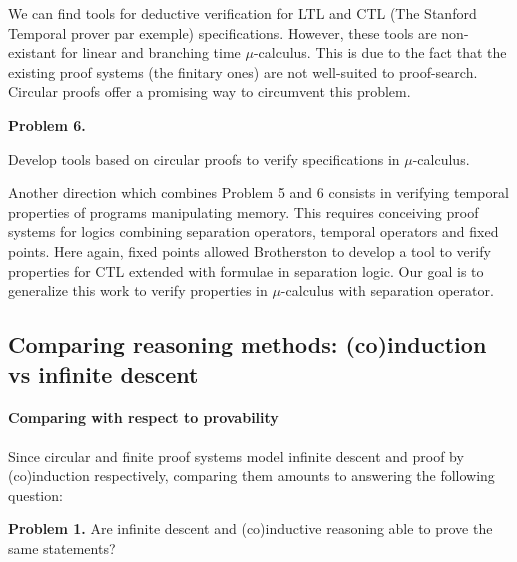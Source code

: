 \documentclass[11pt,twocolumn]{article}
\begin{document}
We can find tools for deductive verification for LTL and CTL (The Stanford Temporal prover par exemple) specifications. However, these tools are non-existant for linear and branching time $\mu$-calculus. This is due to the fact that the existing proof systems (the finitary ones) are not well-suited to proof-search. Circular proofs offer a promising way to circumvent this problem. 


\begin{center}
\begin{bclogo}[logo= ,arrondi = 0.1, couleur = green!10,  epBarre = 0]{}
  \vspace{-10pt}
  \textbf{Problem 6.}
  
  Develop tools based on circular proofs to verify specifications in $\mu$-calculus.
\end{bclogo}
\end{center}

Another direction which combines Problem 5 and 6 consists in verifying temporal properties of programs manipulating memory. This requires conceiving proof systems for logics combining separation operators, temporal operators and fixed points. Here again, fixed points allowed Brotherston to develop a tool  \cite{TellezB17} to verify properties for CTL extended with formulae in separation logic. Our goal is to generalize this work to verify properties in $\mu$-calculus with separation operator.

\subsection{Comparing reasoning methods: (co)induction vs infinite descent}

\label{ComparaisonParkCirc}

\paragraph{Comparing with respect to provability}

Since circular and finite proof systems model infinite descent and proof by (co)induction respectively, comparing them amounts to answering the following question:
\begin{center}
\begin{bclogo}[logo= ,arrondi = 0.1, couleur = green!10,  epBarre = 0]{}
  \vspace{-10pt}
  \textbf{Problem 1.}
Are infinite descent and (co)inductive reasoning able to prove the same statements?

\end{bclogo}
\end{center}
\end{document}
